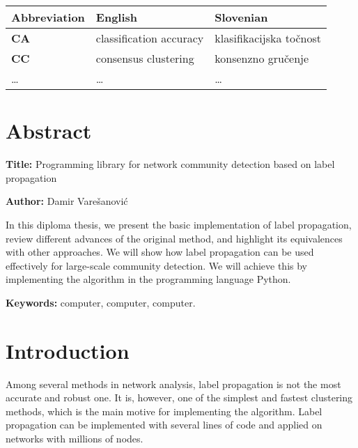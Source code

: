 \documentclass[a4paper, 12pt]{book}
\newcommand{\ttitleEn}{Programming library for network community detection based on label propagation}
\newcommand{\tauthor}{Damir Varešanović}
\newcommand{\tkeywordsEn}{computer, computer, computer}
\newcommand{\clearemptydoublepage}{\newpage{\pagestyle{empty}\cleardoublepage}}
\begin{document}
\noindent\begin{tabular}{p{}|p{}|p{}}    %
  {\bf Abbreviation} & {\bf English}                             & {\bf Slovenian} \\ \hline
  {\bf CA}      & classification accuracy               & klasifikacijska točnost \\
  {\bf CC} & consensus clustering & konsenzno gručenje \\
  \dots & \dots & \dots \\
\end{tabular}


\clearemptydoublepage

\chapter*{Abstract}

\noindent\textbf{Title:} \ttitleEn
\bigskip

\noindent\textbf{Author:} \tauthor
\bigskip

\noindent In this diploma thesis, we present the basic implementation of label propagation, review different advances of the original method, and highlight its equivalences with other approaches. We will show how label propagation can be used effectively for large-scale community detection. We will achieve this by implementing the algorithm in the programming language Python.
\bigskip

\noindent\textbf{Keywords:} \tkeywordsEn.
\clearemptydoublepage

\mainmatter
\setcounter{page}{1}
\pagestyle{fancy}

\chapter{Introduction}
Among several methods in network analysis, label propagation is not the most accurate and robust one. It is, however, one of the simplest and fastest clustering methods, which is the main motive for implementing the algorithm. Label propagation can be implemented with several lines of code and applied on networks with millions of nodes.
\end{document}
